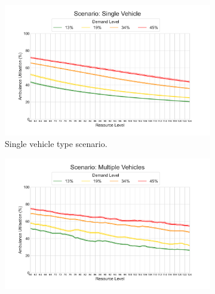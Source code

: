 \documentclass[preprint,12pt]{elsarticle}
\begin{document}

\begin{figure} \begin{center} \begin{subfigure}{0.48\textwidth}
\includegraphics[width=\textwidth]{img/results/single_AmbulanceUtilisation}
\caption{Single vehicle type scenario.}
\label{fig:results_ambulance_utilisation_single} \end{subfigure}
\begin{subfigure}{0.48\textwidth}
    \includegraphics[width=\textwidth]{img/results/multiple_AmbulanceUtilisation}

\end{subfigure}
\end{center}
\end{figure}
\end{document}
